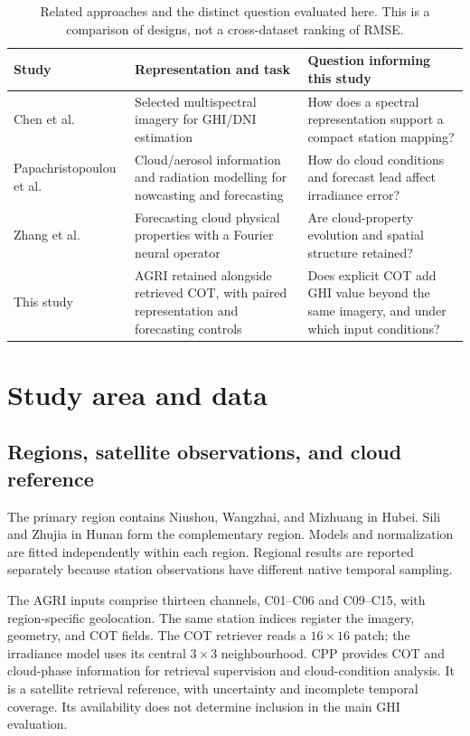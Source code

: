 \documentclass[11pt]{article}
\begin{document}
\begin{table}[!htbp]\centering\small
\caption{Related approaches and the distinct question evaluated here. This is a comparison of designs, not a cross-dataset ranking of RMSE.}\label{tab:related}
\begin{tabularx}{\linewidth}{p{29mm}XX}\toprule
Study & Representation and task & Question informing this study\\\midrule
Chen et al.\ \cite{chen2023} & Selected multispectral imagery for GHI/DNI estimation & How does a spectral representation support a compact station mapping?\\
Papachristopoulou et al.\ \cite{pap2024} & Cloud/aerosol information and radiation modelling for nowcasting and forecasting & How do cloud conditions and forecast lead affect irradiance error?\\
Zhang et al.\ \cite{zhang2026} & Forecasting cloud physical properties with a Fourier neural operator & Are cloud-property evolution and spatial structure retained?\\
This study & AGRI retained alongside retrieved COT, with paired representation and forecasting controls & Does explicit COT add GHI value beyond the same imagery, and under which input conditions?\\\bottomrule
\end{tabularx}\end{table}

\section{Study area and data}
\subsection{Regions, satellite observations, and cloud reference}
The primary region contains Niushou, Wangzhai, and Mizhuang in Hubei. Sili and Zhujia in Hunan form the complementary region. Models and normalization are fitted independently within each region. Regional results are reported separately because station observations have different native temporal sampling.

The AGRI inputs comprise thirteen channels, C01--C06 and C09--C15, with region-specific geolocation. The same station indices register the imagery, geometry, and COT fields. The COT retriever reads a $16\times16$ patch; the irradiance model uses its central $3\times3$ neighbourhood. CPP provides COT and cloud-phase information for retrieval supervision and cloud-condition analysis. It is a satellite retrieval reference, with uncertainty and incomplete temporal coverage. Its availability does not determine inclusion in the main GHI evaluation.
\end{document}
